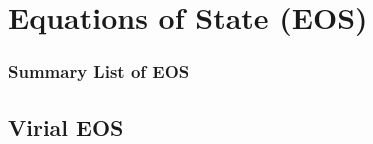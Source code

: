 \documentclass[10pt,compress]{beamer}
\begin{document}
\section{Equations of State (EOS)}

\scriptsize
\begin{frame}
 \frametitle{Summary List of EOS}
\end{frame}
\normalsize


\subsection{Virial EOS}
\end{document}
